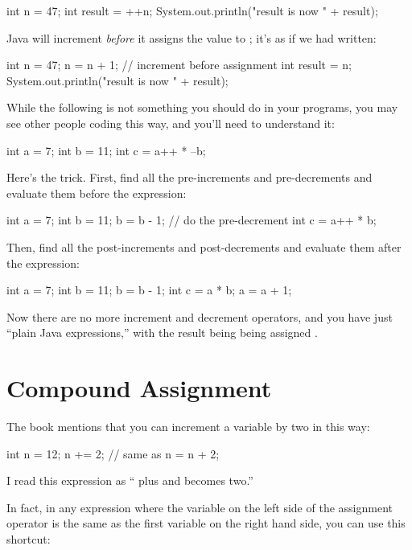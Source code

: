\begin{code}
int n = 47;
int result = ++n;
System.out.println("result is now " + result);
\end{code}

Java will increment  {\em before} it assigns the value to ; it's as if we had written:

\begin{code}
int n = 47;
n = n + 1; // increment before assignment
int result = n;
System.out.println("result is now " + result);
\end{code}

While the following is not something you should do in your programs, you may see other people coding this way, and you'll need to understand it:

\begin{code}
int a = 7;
int b = 11;
int c = a++ * --b;
\end{code}

Here's the trick. First, find all the pre-increments and pre-decrements and evaluate them before the expression:

\begin{code}
int a = 7;
int b = 11;
b = b - 1; // do the pre-decrement
int c = a++ * b;
\end{code}

Then, find all the post-increments and post-decrements and evaluate them after the expression:

\begin{code}
int a = 7;
int b = 11;
b = b - 1;
int c = a * b;
a = a + 1;
\end{code}

Now there are no more increment and decrement operators, and you have just ``plain Java expressions,'' with the result being  being assigned .

\section{Compound Assignment}
The book mentions that you can increment a variable by two in this way:

\begin{code}
int n = 12;
n += 2; // same as n = n + 2;
\end{code}

I read this expression as `` plus and becomes two.''

In fact, in any expression where the variable on the left side of the assignment operator is the same as the first variable on the right hand side, you can use this shortcut:

